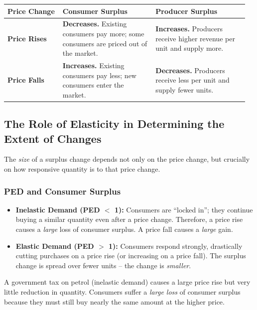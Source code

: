 \documentclass[11pt, a4paper, twoside]{book}
\begin{document}
\begin{tcolorbox}[enhanced,colback=LightBlue,colframe=MidBlue!70,arc=0pt,boxrule=0.8pt]
\begin{tabular}{@{}>{\RaggedRight\arraybackslash}p{0.22\linewidth}>{\RaggedRight\arraybackslash}p{0.37\linewidth}>{\RaggedRight\arraybackslash}p{0.37\linewidth}@{}}
\textbf{\color{NavyPrimary}Price Change} & \textbf{\color{NavyPrimary}Consumer Surplus} & \textbf{\color{NavyPrimary}Producer Surplus} \\
\midrule
\textbf{Price Rises} & \textbf{Decreases.} Existing consumers pay more; some consumers are priced out of the market. & \textbf{Increases.} Producers receive higher revenue per unit and supply more. \\
\textbf{Price Falls} & \textbf{Increases.} Existing consumers pay less; new consumers enter the market. & \textbf{Decreases.} Producers receive less per unit and supply fewer units. \\
\end{tabular}
\end{tcolorbox}

\subsection{The Role of Elasticity in Determining the Extent of Changes}

The \emph{size} of a surplus change depends not only on the price change, but crucially on how responsive quantity is to that price change.

\subsubsection{PED and Consumer Surplus}

\begin{itemize}
  \item \textbf{Inelastic Demand (PED $<$ 1):} Consumers are ``locked in''; they continue buying a similar quantity even after a price change. Therefore, a price rise causes a \emph{large} loss of consumer surplus. A price fall causes a \emph{large} gain.
  \item \textbf{Elastic Demand (PED $>$ 1):} Consumers respond strongly, drastically cutting purchases on a price rise (or increasing on a price fall). The surplus change is spread over fewer units -- the change is \emph{smaller}.
\end{itemize}

\begin{example}
A government tax on petrol (inelastic demand) causes a large price rise but very little reduction in quantity. Consumers suffer a \emph{large loss} of consumer surplus because they must still buy nearly the same amount at the higher price.
\end{example}
\end{document}
